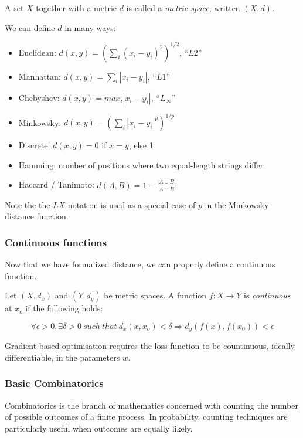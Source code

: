 \documentclass{article}
\begin{document}
A set \(X\) together with a metric \(d\) is called a \emph{metric
space}, written \((X,
d)\).

We can define \(d\) in many ways:

\begin{itemize}
\tightlist
\item
  Euclidean: \(d(x, y) = (\sum_i (x_i - y_i)^2)^{1/2}\), ``\(L2\)''
\item
  Manhattan: \(d(x, y) = \sum_i |x_i - y_i|\), ``\(L1\)''
\item
  Chebyshev: \(d(x, y) = max_i |x_i - y_i|\), ``\(L_{\infty}\)''
\item
  Minkowsky: \(d(x, y) = (\sum_i |x_i - y_i|^p)^{1/p}\)
\item
  Discrete: \(d(x, y)  = 0\) if \(x=y\), else 1
\item
  Hamming: number of positions where two equal-length strings differ
\item
  Haccard / Tanimoto: \(d(A, B)=1-\frac{|A \cup B|}{A \cap B}\)
\end{itemize}

Note the the \(LX\) notation is used as a special case of \(p\) in the
Minkowsky distance function.

\subsubsection{Continuous functions}\label{continuous-functions}

Now that we have formalized distance, we can properly define a
continuous function.

Let \((X, d_x)\) and \((Y, d_y)\) be metric spaces. A function
\(f: X \rightarrow Y\) is \emph{continuous} at \(x_o\) if the following
holds:

\[\forall \epsilon > 0, \exists \delta > 0\ such\ that\ d_x(x, x_o) < \delta
\Rightarrow d_y(f(x), f(x_0)) < \epsilon\]

Gradient-based optimisation requires the loss function to be
countinuous, ideally differentiable, in the parameters \(w\).

\subsubsection{Basic Combinatorics}\label{basic-combinatorics}

Combinatorics is the branch of mathematics concerned with counting the
number of possible outcomes of a finite process. In probability,
counting techniques are particularly useful when outcomes are equally
likely.
\end{document}
